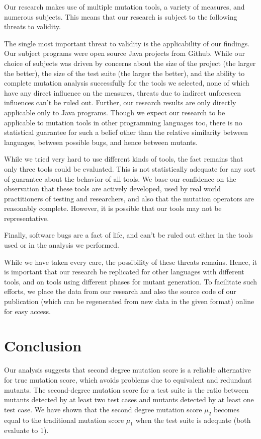 \documentclass[conference]{IEEEtran}
\newcounter{observation}
\begin{document}
Our research makes use of multiple mutation tools, a variety of measures, and
numerous subjects. This means that our research is subject to the
following threats to validity.

The single most important threat to validity is the applicability of our
findings. Our subject programs were open source Java projects from Github.
While our choice of subjects was driven by concerns about the size of the
project (the larger the better), the size of the test suite (the larger
the better), and the ability to complete mutation analysis successfully
for the tools we selected, none of which  have any direct influence on the
measures, threats due to indirect unforeseen influences can't be ruled out.
Further, our research results are only directly applicable only to Java
programs. Though we expect our research to be applicable to mutation tools
in other programming languages too, there is no statistical guarantee for
such a belief other than the relative similarity between languages, between
possible bugs, and hence between mutants.

While we tried very hard to use different kinds of tools, the fact remains
that only three tools could be evaluated. This is not statistically adequate
for any sort of guarantee about the behavior of all tools. We base our
confidence on the observation that these tools are actively developed, used
by real world practitioners of testing and researchers, and also that the
mutation operators are reasonably complete. However, it is possible that
our tools may not be representative.

Finally, software bugs are a fact of life, and can't be ruled out either
in the tools used or in the analysis we performed.

While we have taken every care, the possibility of these threats remains.
Hence, it is important that our research be replicated for other languages
with different tools, and on tools using different phases for mutant
generation. To facilitate such efforts, we place the data from our
research and also the source code of our publication (which can be regenerated
from new data in the given format) online for easy access.




\section{Conclusion}
\label{sec:conclusion}

Our analysis suggests that second degree mutation score is a reliable
alternative for true mutation score, which avoids problems due to equivalent
and redundant mutants.   The second-degree mutation score for a test
suite is the ratio between mutants detected by at least two test cases
and mutants detected by at least one test case.  We have shown that the second degree
mutation score $\mu_2$ becomes equal to the traditional
mutation score $\mu_1$ when the test suite is adequate
(both evaluate to 1).
\end{document}
